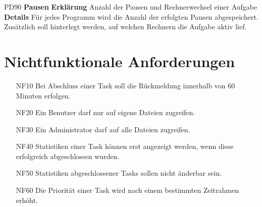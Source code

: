\documentclass[a4paper,12pt]{article}
\begin{document}
\begin{itemize}[nosep]
\begin{minipage}[t]{\linewidth}
\item[PD90] \textbf{Pausen}
\subitem \textbf{Erklärung} Anzahl der Pausen und Rechnerwechsel einer Aufgabe
\subitem \textbf{Details} Für jedes Programm wird die Anzahl der erfolgten Pausen abgespeichert.\newline
Zusätzlich soll hinterlegt werden, auf welchen Rechnern die Aufgabe aktiv lief.
\end{minipage}

\end{itemize}
\newpage

\section{Nichtfunktionale Anforderungen}
\begin{itemize}[nosep]
\leftskip=0.5cm

	\item[NF10] Bei Abschluss einer Task soll die Rückmeldung innerhalb von 60 Minuten erfolgen.
	
	\item[NF20] Ein Benutzer darf nur auf eigene Dateien zugreifen.
	
	\item[NF30] Ein \gls{Administrator} darf auf alle Dateien zugreifen.
	
	\item[NF40] Statistiken einer Task können erst angezeigt werden, wenn diese erfolgreich abgeschlossen wurden. %
	
	\item[NF50] Statistiken abgeschlossener Tasks sollen nicht änderbar sein.
	
	\item[NF60] Die Priorität einer Task wird nach einem bestimmten Zeitrahmen erhöht. %



\end{itemize}
\end{document}
